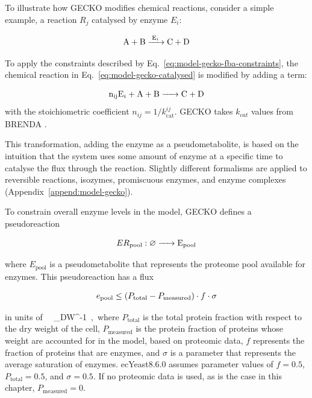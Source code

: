 
To illustrate how GECKO modifies chemical reactions, consider a simple example, a reaction $R_{j}$ catalysed by enzyme $E_{i}$:

\begin{equation}
  \ce{ A + B ->[E_{i}] C + D }
  \label{eq:model-gecko-catalysed}
\end{equation}

To apply the constraints described by Eq.\ \ref{eq:model-gecko-fba-constraints}, the chemical reaction in Eq.\ \ref{eq:model-gecko-catalysed} is modified by adding a term:

\begin{equation}
  \ce{ n_{ij}E_{i} + A + B -> C + D }
  \label{eq:model-gecko-catalysed-formalism}
\end{equation}
with the stoichiometric coefficient $n_{ij} = 1/k_{\mathrm{cat}}^{ij}$.
GECKO takes $k_{cat}$ values from BRENDA \parencite{changBRENDAELIXIRCore2021}.

This transformation, adding the enzyme as a pseudometabolite, is based on the intuition that the system uses some amount of enzyme at a specific time to catalyse the flux through the reaction.
Slightly different formalisms are applied to reversible reactions, isozymes, promiscuous enzymes, and enzyme complexes (Appendix~\ref{append:model-gecko}).

To constrain overall enzyme levels in the model, GECKO defines a pseudoreaction

\begin{equation}
  ER_{\mathrm{pool}}: \varnothing \ce{ -> E_{pool} }
  \label{eq:model-gecko-enzyme-pool}
\end{equation}

where $E_{\mathrm{pool}}$ is a pseudometabolite that represents the proteome pool available for enzymes.
This pseudoreaction has a flux

\begin{equation}
  e_{\mathrm{pool}} \leq (P_{\mathrm{total}} - P_{\mathrm{measured}}) \cdot f \cdot \sigma
  \label{eq:model-gecko-enzyme-pool-flux}
\end{equation}

in units of \SI{}{\gram~\gram_{DW}^{-1}}, where
$P_{\mathrm{total}}$ is the total protein fraction with respect to the dry weight of the cell,
$P_{\mathrm{measured}}$ is the protein fraction of proteins whose weight are accounted for in the model, based on proteomic data,
$f$ represents the fraction of proteins that are enzymes, and
$\sigma$ is a parameter that represents the average saturation of enzymes.
ecYeast8.6.0 assumes parameter values of $f = 0.5$, $P_{\mathrm{total}} = 0.5$, and $\sigma = 0.5$.
If no proteomic data is used, as is the case in this chapter, $P_{\mathrm{measured}} = 0$.

